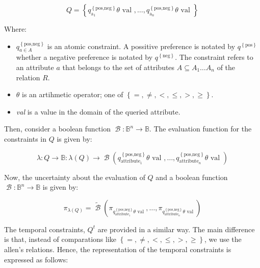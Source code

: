\documentclass{llncs}
\newcommand{\bool}{\operatorname*{\mathcal{B}}}
\newcommand{\Boolean}{\mathbb{B}}
\begin{document}
\begin{equation}
 \label{eq:non-temporal-constraints}
Q = \left \lbrace q^{\left \lbrace \mbox{pos,neg} \right \rbrace}_{\mbox{a}_1}  \theta \mbox{ val }, \ldots, q^{\left \lbrace \mbox{pos,neg} \right \rbrace}_{\mbox{a}_n}  \theta \mbox{ val } \right \rbrace
\end{equation}


Where:
\begin{itemize}
 \item $q^{\left \lbrace \mbox{pos,neg} \right \rbrace}_{a \in A }$ is an atomic constraint. A possitive preference is notated by $q^{\left \lbrace \mbox{pos} \right \rbrace}$ whether a negative preference is notated by $q^{\left \lbrace \mbox{neg} \right \rbrace}$. The constraint refers to an attribute $a$ that belongs to the set of attributes $A \subseteq A_1 \ldots A_n $ of the relation $R$.
\item $\theta$ is an artihmetic operator; one of $\left \lbrace =, \neq, <, \leq, >, \geq \right \rbrace$.
\item \emph{val} is a value in the domain of the queried attribute. 
 \end{itemize}

 

Then, consider a boolean function $\bool:\Boolean^{n}  \rightarrow \Boolean$. The evaluation function for the constraints in $Q$  is given by:

\begin{equation}
 \label{eq:evaluation-function}
\lambda : Q \rightarrow \Boolean : \lambda (Q) \rightarrow \bool \left(q^{\left \lbrace \mbox{pos,neg} \right \rbrace}_{\mbox{attribute}_1}  \theta \mbox{ val }, \ldots, q^{\left \lbrace \mbox{pos,neg} \right \rbrace}_{\mbox{attribute}_n}  \theta \mbox{ val } \right)
\end{equation}

Now, the uncertainty about the evaluation of $Q$ and a boolean function $\bool:\Boolean^{n}  \rightarrow \Boolean$ is given by:

\begin{equation}
 \label{eq:evaluation-lambda-function}
\pi_{\lambda \left(Q \right)} = \tilde{\bool} \left(\pi_{q^{\left \lbrace \mbox{pos,neg} \right \rbrace}_{\mbox{attribute}_1}  \theta \mbox{ val }}, \ldots, \pi_{q^{\left \lbrace \mbox{pos,neg} \right \rbrace}_{\mbox{attribute}_n}  \theta \mbox{ val }} \right)
\end{equation}


The temporal constraints, $Q^t$ are provided in a similar way. The main difference is that, instead of comparations like $\left \lbrace =, \neq, <, \leq, >, \geq \right \rbrace$, we use the allen's relations. Hence, the representation of the temporal constraints is expressed as follows:
\end{document}

